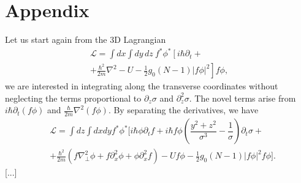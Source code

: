 \documentclass[pra,twocolumn]{revtex4-2}
\begin{document}
\section{Appendix}\label{sec:appendix}
Let us start again from the 3D Lagrangian     
	\begin{equation}
     \begin{split}
        \mathcal{L}= \int dx \int dy \, dz \ f^* \phi^*\left[i \hbar \partial_t + \right.\\\left.
        +\frac{\hbar^2}{2 m} \nabla^2-U-\frac{1}{2} g_0(N-1)|f \phi|^2 \right] f \phi,
     \end{split}
	\end{equation}
    we are interested in integrating along the transverse coordinates without neglecting the terms proportional to $\partial_z \sigma$ and $\partial_z^2 \sigma$. The novel terms arise from $i\hbar\partial_t (f\phi)$ and $\frac{\hbar}{2m}\nabla^2 (f\phi)$. By separating the derivatives, we have
    \begin{equation}
    	\begin{split}
        &\mathcal{L}= \int dz \int dx dy  f^* \phi^*\biggl[i \hbar \phi \partial_t f + i \hbar f  \phi \left(\dfrac{y^2+z^2}{\sigma^3} - \dfrac{1}{\sigma}\right)\partial_t \sigma + \\ 
        &+  \frac{\hbar^2}{2 m} (f\nabla_\perp^2 \phi+ f \partial_x^2 \phi + \phi\partial_x^2 f)-U f \phi-\frac{1}{2} g_0(N-1)|f \phi|^2 f \phi\biggr].
    	\end{split}
    \end{equation}
    [...]
\end{document}
